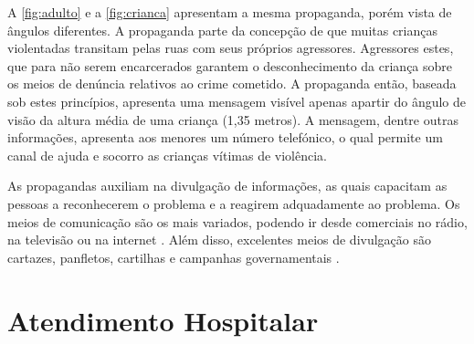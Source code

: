 A \autoref{fig:adulto} e a \autoref{fig:crianca} apresentam a mesma propaganda, porém vista de ângulos diferentes. A propaganda parte da concepção de que muitas crianças violentadas transitam pelas ruas com seus próprios agressores. Agressores estes, que para não serem encarcerados garantem o desconhecimento da criança sobre os meios de denúncia relativos ao crime cometido. A propaganda então, baseada sob estes princípios, apresenta uma mensagem visível apenas apartir do ângulo de visão da altura média de uma criança (1,35 metros). A mensagem, dentre outras informações, apresenta aos menores um número telefónico, o qual permite um canal de ajuda e socorro as crianças vítimas de violência. 

As propagandas auxiliam na divulgação de informações, as quais capacitam as pessoas a reconhecerem o problema e a reagirem adquadamente ao problema. Os meios de comunicação são os mais variados, podendo ir desde comerciais no rádio, na televisão ou na internet \cite{martinez2011prevencion}. Além disso, excelentes meios de divulgação são cartazes, panfletos, cartilhas e campanhas governamentais \cite{mendelson2015parent}.




\section{Atendimento Hospitalar}\label{sec:hospital}

